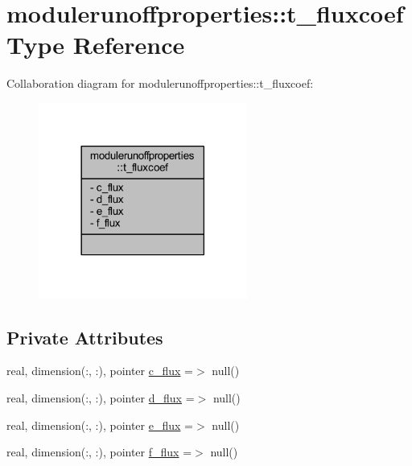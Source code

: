 \hypertarget{structmodulerunoffproperties_1_1t__fluxcoef}{}\section{modulerunoffproperties\+:\+:t\+\_\+fluxcoef Type Reference}
\label{structmodulerunoffproperties_1_1t__fluxcoef}


Collaboration diagram for modulerunoffproperties\+:\+:t\+\_\+fluxcoef\+:\nopagebreak
\begin{figure}[H]
\begin{center}
\leavevmode
\includegraphics[width=194pt]{structmodulerunoffproperties_1_1t__fluxcoef__coll__graph}
\end{center}
\end{figure}
\subsection*{Private Attributes}
\begin{DoxyCompactItemize}
\item 
real, dimension(\+:, \+:), pointer \mbox{\hyperlink{structmodulerunoffproperties_1_1t__fluxcoef_aaff0408ef0293356537431fbbfc7c7dc}{c\+\_\+flux}} =$>$ null()
\item 
real, dimension(\+:, \+:), pointer \mbox{\hyperlink{structmodulerunoffproperties_1_1t__fluxcoef_ab8f54e15ed036074ff0cbb30bfb335ea}{d\+\_\+flux}} =$>$ null()
\item 
real, dimension(\+:, \+:), pointer \mbox{\hyperlink{structmodulerunoffproperties_1_1t__fluxcoef_a3ebe20ec4d58b720aa600a24a9dfa82e}{e\+\_\+flux}} =$>$ null()
\item 
real, dimension(\+:, \+:), pointer \mbox{\hyperlink{structmodulerunoffproperties_1_1t__fluxcoef_a36cc21c5d7b2b61a4585f686ab0bb2a0}{f\+\_\+flux}} =$>$ null()
\end{DoxyCompactItemize}


